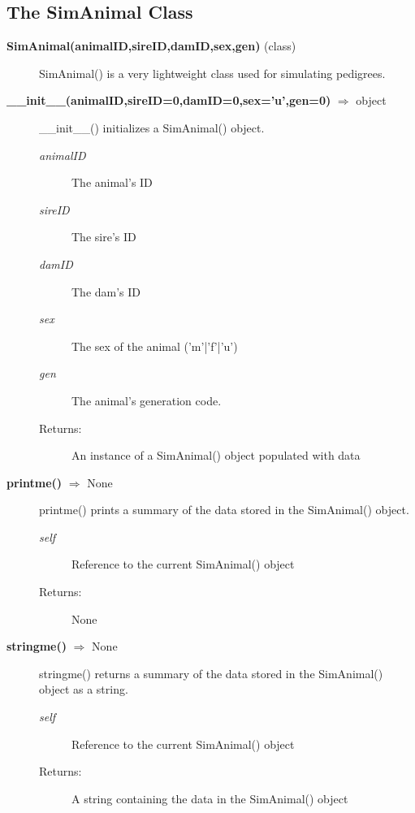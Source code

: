 \subsection*{The SimAnimal Class}
\begin{description}
\item[\textbf{SimAnimal(animalID,sireID,damID,sex,gen)} (class)]
SimAnimal() is a very lightweight class used for simulating pedigrees.

\item[\textbf{\_\_init\_\_(animalID,sireID=0,damID=0,sex='u',gen=0)} $\Rightarrow$ object]
\_\_init\_\_() initializes a SimAnimal() object.
\begin{description}
\item[\emph{animalID}] The animal's ID
\item[\emph{sireID}] The sire's ID
\item[\emph{damID}] The dam's ID
\item[\emph{sex}] The sex of the animal ('m'|'f'|'u')
\item[\emph{gen}] The animal's generation code.
\item[Returns:] An instance of a SimAnimal() object populated with data
\end{description}

\item[\textbf{printme()} $\Rightarrow$ None]
printme() prints a summary of the data stored in the SimAnimal() object.
\begin{description}
\item[\emph{self}] Reference to the current SimAnimal() object
\item[Returns:] None
\end{description}

\item[\textbf{stringme()} $\Rightarrow$ None]
stringme() returns a summary of the data stored in the SimAnimal() object as a string.
\begin{description}
\item[\emph{self}] Reference to the current SimAnimal() object
\item[Returns:] A string containing the data in the SimAnimal() object
\end{description}

\end{description}